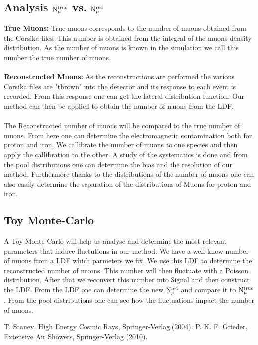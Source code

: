 \documentclass[12pt,a4paper,oneside]{book}
\begin{document}
\subsection{Analysis $\rm{N}_{\mu}^{true}$ vs. $\rm{N}_{\mu}^{rec}$}

\textbf{True Muons: } True muons corresponds to the number of muons obtained from the Corsika files. This number is obtained from the integral of the muons density distribution. As the number of muons is known in the simulation we call this number the true number of muons.\\\\
\textbf{Reconstructed Muons: } As the reconstructions are performed the various Corsika files are "thrown" into the detector and its response to each event is recorded. From this response one can get the lateral distribution function. Our method can then be applied to obtain the number of muons from the LDF.\\\\ 
The Reconstructed number of muons will be compared to the true number of muons. From here one can determine the electromagnetic contamination both for proton and iron. We callibrate the number of muons to one species and then apply the callibration to the other. A study of the systematics is done and from the pool distributions one can determine the bias and the resolution of our method. Furthermore thanks to the distributions of the number of muons one can also easily determine the separation of the distributions of Muons for proton and iron.

\subsection{Toy Monte-Carlo}
A Toy Monte-Carlo will help us analyse and determine the most relevant parameters that induce fluctutions in our method. We have a well know number of muons from a LDF which parmeters we fix. We use this LDF to determine the reconstructed number of muons. This number will then fluctuate with a Poisson distribution. After that we reconvert this number into Signal and then construct the LDF. From the LDF one can determine the new $\rm{N}_{\mu}^{rec}$ and compare it to $\rm{N}_{\mu}^{true}$. From the pool distributions one can see how the fluctuations impact the number of muons. 











\begin{thebibliography}{10}
\fancyhead{} %
\bibitem{[B01]}
	{T. Stanev, High Energy Cosmic Rays, Springer-Verlag (2004).}
\bibitem{[B09]}
	{P. K. F. Grieder, Extensive Air Showers, Springer-Verlag (2010).}



\end{thebibliography}
\end{document}
